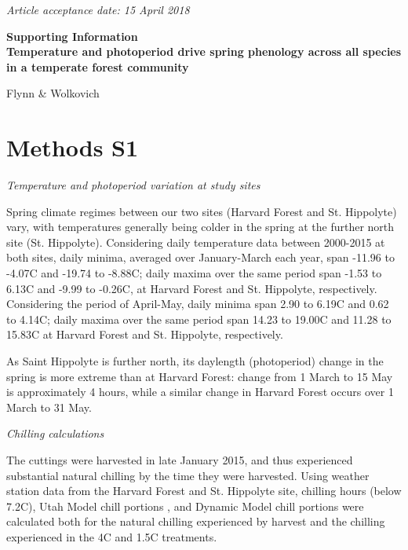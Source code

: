 \documentclass{article}
\begin{document}
\noindent \emph{Article acceptance date: 15 April 2018}
\begin{center}
\textbf{\Large{Supporting Information \vspace{1ex}\\Temperature and photoperiod drive spring phenology across all species in a temperate forest community}}

Flynn \& Wolkovich
\end{center}

\renewcommand{\thetable}{S\arabic{table}}
\renewcommand{\thefigure}{S\arabic{figure}}

\section*{Methods S1}

\noindent\emph{Temperature and photoperiod variation at study sites}

\noindent Spring climate regimes between our two sites (Harvard Forest and St. Hippolyte) vary, with temperatures generally being colder in the spring at the further north site (St. Hippolyte). Considering daily temperature data between 2000-2015 at both sites, daily minima, averaged over January-March each year, span -11.96 to -4.07\degree C and -19.74 to -8.88\degree C; daily maxima over the same period span -1.53 to 6.13\degree C and -9.99 to -0.26\degree C, at Harvard Forest and St. Hippolyte, respectively. Considering the period of April-May, daily minima span 2.90 to 6.19\degree C and 0.62 to 4.14\degree C; daily maxima over the same period span 14.23 to 19.00\degree C and 11.28 to 15.83\degree C at Harvard Forest and St. Hippolyte, respectively. 

\noindent As Saint Hippolyte is further north, its daylength (photoperiod) change in the spring is more extreme than at Harvard Forest: change from 1 March to 15 May is approximately 4 hours, while a similar change in Harvard Forest occurs over 1 March to 31 May. 

\noindent\emph{Chilling calculations}

\noindent The cuttings were harvested in late January 2015, and thus experienced substantial natural chilling by the time they were harvested. Using weather station data from the Harvard Forest and St. Hippolyte site, chilling hours (below 7.2\degree C), Utah Model chill portions \citep{utahmodel}, and Dynamic Model \citep{Erez:1988} chill portions were calculated both for the natural chilling experienced by harvest and the chilling experienced in the 4\degree C and 1.5\degree C treatments. 
\end{document}
